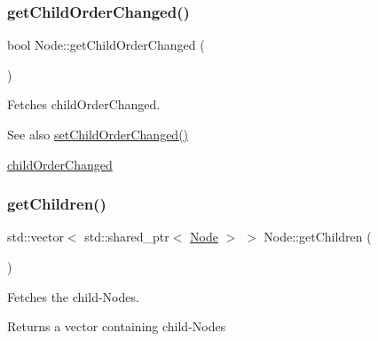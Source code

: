\mbox{\label{classsage_1_1Node_a983910d41113519eb25d015eac2b4ad0}} 
\subsubsection{\texorpdfstring{getChildOrderChanged()}{getChildOrderChanged()}}
{\footnotesize\ttfamily bool Node\+::get\+Child\+Order\+Changed (\begin{DoxyParamCaption}{ }\end{DoxyParamCaption})\hspace{0.3cm}{\ttfamily [protected]}}



Fetches child\+Order\+Changed. 

\begin{DoxySeeAlso}{See also}
\mbox{\hyperlink{classsage_1_1Node_adaf7f298bffc7e09d6b4dd4f7c7e0e1a}{set\+Child\+Order\+Changed()}} 

\mbox{\hyperlink{classsage_1_1Node_af78e7de5e455b1c64036f09a8889f51d}{child\+Order\+Changed}} 
\end{DoxySeeAlso}
\mbox{\label{classsage_1_1Node_a13a5d97132d87b57bd68eb8662f1b505}} 
\subsubsection{\texorpdfstring{getChildren()}{getChildren()}}
{\footnotesize\ttfamily std\+::vector$<$ std\+::shared\+\_\+ptr$<$ \mbox{\hyperlink{classsage_1_1Node}{Node}} $>$ $>$ Node\+::get\+Children (\begin{DoxyParamCaption}{ }\end{DoxyParamCaption})}



Fetches the child-\/\+Nodes. 

\begin{DoxyReturn}{Returns}
a vector containing child-\/\+Nodes 
\end{DoxyReturn}
\mbox{\label{classsage_1_1Node_a5c4c28939c7adf7e4a65dbb02c0cbcd3}} 
